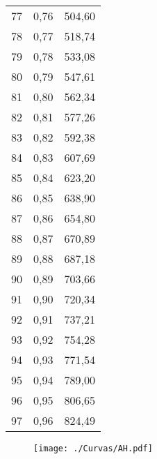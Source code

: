 \documentclass[]{article}
\begin{document}
\begin{longtable}[t]{ccc}
77 & 0,76 & 504,60\\
78 & 0,77 & 518,74\\
79 & 0,78 & 533,08\\
80 & 0,79 & 547,61\\
81 & 0,80 & 562,34\\
82 & 0,81 & 577,26\\
83 & 0,82 & 592,38\\
84 & 0,83 & 607,69\\
85 & 0,84 & 623,20\\
86 & 0,85 & 638,90\\
87 & 0,86 & 654,80\\
88 & 0,87 & 670,89\\
89 & 0,88 & 687,18\\
90 & 0,89 & 703,66\\
91 & 0,90 & 720,34\\
92 & 0,91 & 737,21\\
93 & 0,92 & 754,28\\
94 & 0,93 & 771,54\\
95 & 0,94 & 789,00\\
96 & 0,95 & 806,65\\
97 & 0,96 & 824,49\\*
\end{longtable}

\clearpage

\begin{sidewaysfigure}[htb]
   \centering
   \texttt{[image: ./Curvas/AH.pdf]}
\end{sidewaysfigure}

\clearpage
\end{document}
